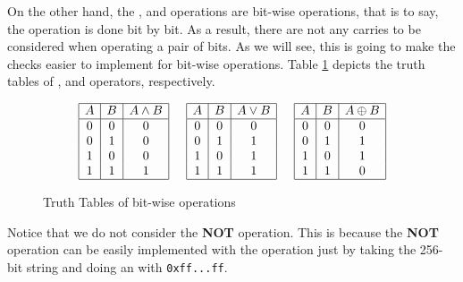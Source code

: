 On the other hand, the \AND, \OR and \XOR operations are bit-wise operations, that is to say, the operation is done bit by bit. As a result, there are not any carries to be considered when operating a pair of bits. As we will see, this is going to make the checks easier to implement for bit-wise operations. Table \ref{tab:truth-tables} depicts the truth tables of \AND, \OR and \XOR operators, respectively.

\begin{figure}[h!]
    \[
    \begin{array}{|c|c|c|}
        \hline
        A 	&B 		&A \land B 	\\
        \hline
        0 	&0 		&0 				\\
        0 	&1 		&0				\\
        1 	&0 		&0 				\\
        1 	&1 		&1 				\\
        \hline
    \end{array}
    \hspace{0.5cm}
    \begin{array}{|c|c|c|}
        \hline
        A 	&B 		&A \lor B 	\\
        \hline
        0 	&0 		&0 				\\
        0 	&1 		&1				\\
        1 	&0 		&1 				\\
        1 	&1 		&1 				\\
        \hline
    \end{array}
    \hspace{0.5cm}
    \begin{array}{|c|c|c|}
        \hline
        A 	&B 		&A \oplus B 	\\
        \hline
        0 	&0 		&0 				\\
        0 	&1 		&1				\\
        1 	&0 		&1 				\\
        1 	&1 		&0 				\\
        \hline
    \end{array}
    \]
    \caption{Truth Tables of bit-wise operations}
    \label{tab:truth-tables}
\end{figure}

Notice that we do not consider the \textbf{NOT} operation. This is because the \textbf{NOT} operation can be easily implemented with the \XOR operation just by taking the 256-bit string and doing an \XOR with \texttt{0xff...ff}.



